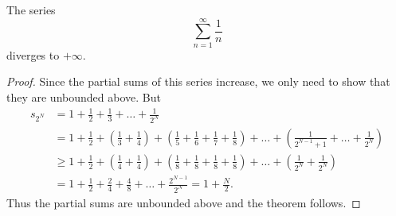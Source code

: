 \documentclass[10pt, a4paper]{article}
\newcommand{\sumfrto}[3][n = 1]{\sum_{#1}^{#2}{#3}} %
\newcommand{\sumto}[2][\infty]{\sumfrto{#1}{#2}}
\begin{document}
\begin{theorem}
    The series
    \[
    \sumto{\dfrac{1}{n}}
    \]
    diverges to $+\infty.$
    \begin{proof}
        Since the partial sums of this series increase, we only need to show that they are unbounded above. But
        \begin{align*}
            s_{2 ^ N} &= 1 + \frac{1}{2} + \frac{1}{3} + \dotsc + \frac{1}{2 ^ N} \\
            &= 1 + \frac{1}{2} + \left(\frac{1}{3} + \frac{1}{4}\right) + \left(\frac{1}{5} + \frac{1}{6} + \frac{1}{7} + \frac{1}{8}\right) + \dotsc + \left(\frac{1}{2 ^ {N - 1} + 1} + \dotsc + \frac{1}{2 ^ N}\right) \\
            &\geq 1 + \frac{1}{2} + \left(\frac{1}{4} + \frac{1}{4}\right) + \left(\frac{1}{8} + \frac{1}{8} + \frac{1}{8} + \frac{1}{8}\right) + \dotsc + \left(\frac{1}{2 ^ N} + \frac{1}{2 ^ N}\right) \\
            &= 1 + \frac{1}{2} + \frac{2}{4} + \frac{4}{8} + \dotsc + \frac{2 ^ {N - 1}}{2 ^ N} = 1 + \frac{N}{2}.
        \end{align*}
        Thus the partial sums are unbounded above and the theorem follows.
    \end{proof}
\end{theorem}
\end{document}
